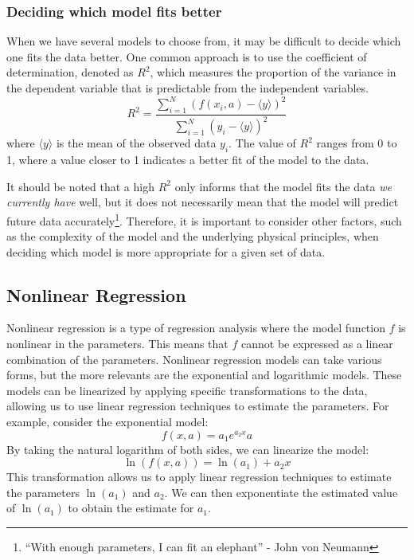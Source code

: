 \subsubsection{Deciding which model fits better}

When we have several models to choose from, it may be difficult to decide which one fits the data better. One common approach is to use the coefficient of determination, denoted as $R^2$, which measures the proportion of the variance in the dependent variable that is predictable from the independent variables.
\begin{equation*}
    R^2 = \dfrac{\sum\limits_{i=1}^N (f(x_i, a) - \langle y \rangle)^2}{\sum\limits_{i=1}^N (y_i - \langle y \rangle)^2}
\end{equation*}
where $\langle y \rangle$ is the mean of the observed data $y_i$. The value of $R^2$ ranges from 0 to 1, where a value closer to 1 indicates a better fit of the model to the data.
\begin{observacion}
    It should be noted that a high $R^2$ only informs that the model fits the data \emph{we currently have} well, but it does not necessarily mean that the model will predict future data accurately\footnote{``With enough parameters, I can fit an elephant'' - John von Neumann}. Therefore, it is important to consider other factors, such as the complexity of the model and the underlying physical principles, when deciding which model is more appropriate for a given set of data.
\end{observacion}

\subsection{Nonlinear Regression}

Nonlinear regression is a type of regression analysis where the model function $f$ is nonlinear in the parameters. This means that $f$ cannot be expressed as a linear combination of the parameters. Nonlinear regression models can take various forms, but the more relevants are the exponential and logarithmic models. These models can be linearized by applying specific transformations to the data, allowing us to use linear regression techniques to estimate the parameters. For example, consider the exponential model:
\begin{equation*}
    f(x, a) = a_1 e^{a_2 x}a
\end{equation*}
By taking the natural logarithm of both sides, we can linearize the model:
\begin{equation*}
    \ln(f(x, a)) = \ln(a_1) + a_2 x
\end{equation*}
This transformation allows us to apply linear regression techniques to estimate the parameters $\ln(a_1)$ and $a_2$. We can then exponentiate the estimated value of $\ln(a_1)$ to obtain the estimate for $a_1$.